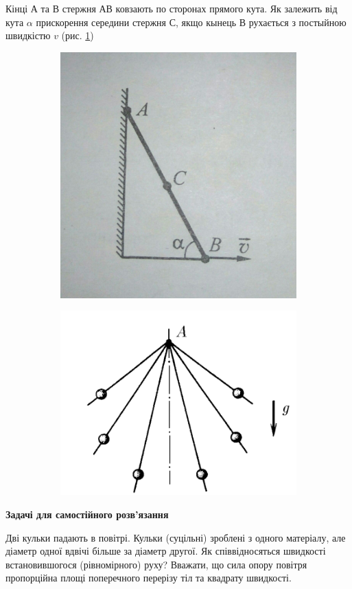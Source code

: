 \begin{problem}{6}
	Кінці А та В стержня АВ ковзають по сторонах прямого кута. Як залежить від кута $\alpha$ прискорення середини стержня С, якщо кынець В рухається з постыйною швидкістю $v$ (рис. \ref{fig:day55})
	
	\begin{figure}[h!]
		\centering
		\begin{subfigure}{.4\textwidth}
			\centering
			\includegraphics[width=0.5\linewidth]{class5/day5_5}
			\caption{}
			\label{fig:day55}
		\end{subfigure}
		\begin{subfigure}{.4\textwidth}
			\centering
			\includegraphics[width=0.5\linewidth]{class3/balls}
			\caption{}
			\label{fig:balls}
		\end{subfigure}
	\caption{}
	\end{figure}
	
\end{problem}

\textbf{Задачі для самостійного розв'язання}

\begin{problem}{3}
	Дві кульки падають в повітрі. Кульки (суцільні) зроблені з одного матеріалу, але діаметр одної вдвічі більше за діаметр другої. Як співвідносяться швидкості встановившогося (рівномірного) руху? Вважати, що сила опору повітря пропорційна площі поперечного перерізу тіл та квадрату швидкості.
\end{problem}

